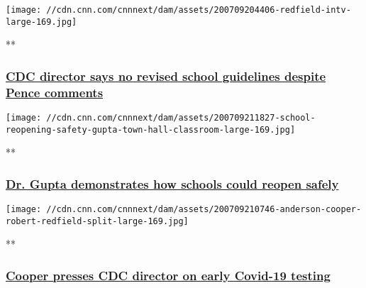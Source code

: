 \href{/videos/politics/2020/07/10/mike-pence-cdc-robert-redfield-guidelines-coronavirus-town-hall-sot-vpx.cnn/video/playlists/cnn-coronavirus-town-hall/}{}

\texttt{[image: //cdn.cnn.com/cnnnext/dam/assets/200709204406-redfield-intv-large-169.jpg]}

**

\hypertarget{cdc-director-says-no-revised-school-guidelines-despite-pence-comments}{%
\subsubsection{\texorpdfstring{\href{/videos/politics/2020/07/10/mike-pence-cdc-robert-redfield-guidelines-coronavirus-town-hall-sot-vpx.cnn/video/playlists/cnn-coronavirus-town-hall/}{CDC
director says no revised school guidelines despite Pence
comments}}{CDC director says no revised school guidelines despite Pence comments}}\label{cdc-director-says-no-revised-school-guidelines-despite-pence-comments}}

\href{/videos/health/2020/07/10/school-reopening-safety-sanjay-gupta-coronavirus-town-hall-sot-vpx.cnn/video/playlists/cnn-coronavirus-town-hall/}{}

\texttt{[image: //cdn.cnn.com/cnnnext/dam/assets/200709211827-school-reopening-safety-gupta-town-hall-classroom-large-169.jpg]}

**

\hypertarget{dr-gupta-demonstrates-how-schools-could-reopen-safely}{%
\subsubsection{\texorpdfstring{\href{/videos/health/2020/07/10/school-reopening-safety-sanjay-gupta-coronavirus-town-hall-sot-vpx.cnn/video/playlists/cnn-coronavirus-town-hall/}{Dr.
Gupta demonstrates how schools could reopen
safely}}{Dr. Gupta demonstrates how schools could reopen safely}}\label{dr-gupta-demonstrates-how-schools-could-reopen-safely}}

\href{/videos/health/2020/07/10/robert-redfield-coronavirus-test-cooper-town-hall-sot-vpx.cnn/video/playlists/cnn-coronavirus-town-hall/}{}

\texttt{[image: //cdn.cnn.com/cnnnext/dam/assets/200709210746-anderson-cooper-robert-redfield-split-large-169.jpg]}

**

\hypertarget{cooper-presses-cdc-director-on-early-covid-19-testing}{%
\subsubsection{\texorpdfstring{\href{/videos/health/2020/07/10/robert-redfield-coronavirus-test-cooper-town-hall-sot-vpx.cnn/video/playlists/cnn-coronavirus-town-hall/}{Cooper
presses CDC director on early Covid-19
testing}}{Cooper presses CDC director on early Covid-19 testing}}\label{cooper-presses-cdc-director-on-early-covid-19-testing}}

